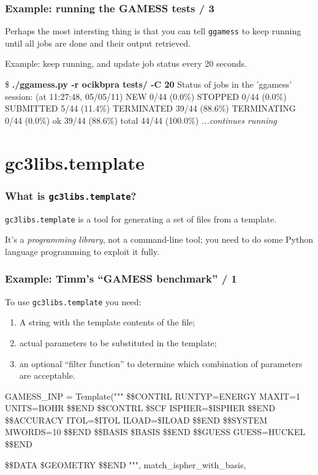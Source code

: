 \documentclass {beamer}
\newcommand{\largeskip}{\vspace{1em}}
\def\+{\largeskip}
\begin{document}
\begin{frame}[fragile]
  \frametitle{Example: running the GAMESS tests / 3}

  Perhaps the most intersting thing is that you can tell
  \texttt{ggamess} to keep running until all jobs are done and their
  output retrieved.

  \+
  Example: keep running, and update job status every 20 seconds.
  \begin{scriptsize}
  \begin{semiverbatim}
\$ \textbf{./ggamess.py -r ocikbpra tests/ -C 20}
Status of jobs in the 'ggamess' session: (at 11:27:48, 05/05/11)
        NEW   0/44     (0.0\%)  
    STOPPED   0/44     (0.0\%)  
  SUBMITTED   5/44    (11.4\%)  
 TERMINATED   39/44   (88.6\%)  
TERMINATING   0/44     (0.0\%)  
         ok   39/44   (88.6\%)  
      total   44/44   (100.0\%) 
\emph{...continues running}
\end{semiverbatim}
  \end{scriptsize}
\end{frame}


\section{gc3libs.template}
\label{sec:templates}

\begin{frame}
  \frametitle{What is \texttt{gc3libs.template}?}

  \texttt{gc3libs.template} is a tool for generating a set of files
  from a template.

  \+
  It's a \emph{programming library}, not a command-line tool; you need
  to do some Python language programming to exploit it fully.
\end{frame}

\begin{frame}[fragile]
  \frametitle{Example: Timm's ``GAMESS benchmark'' / 1}

To use \texttt{gc3libs.template} you need:
\begin{enumerate}
\item A string with the template contents of the file;
\item actual parameters to be substituted in the template;
\item an optional ``filter function'' to determine which combination
  of parameters are acceptable.
\end{enumerate}

  \begin{scriptsize}
\begin{semiverbatim}
GAMESS_INP = Template("""
 \$\$CONTRL RUNTYP=ENERGY MAXIT=1 UNITS=BOHR \$\$END
 \$\$CONTRL \${SCF} ISPHER=\${ISPHER} \$\$END
 \$\$ACCURACY ITOL=\${ITOL} ILOAD=\${ILOAD} \$\$END
 \$\$SYSTEM MWORDS=10 \$\$END
 \$\$BASIS \${BASIS} \$\$END
 \$\$GUESS GUESS=HUCKEL \$\$END

 \$\$DATA
\${GEOMETRY}
 \$\$END
""",
   match_ispher_with_basis,
\end{semiverbatim}
  \end{scriptsize}
\end{frame}
\end{document}
